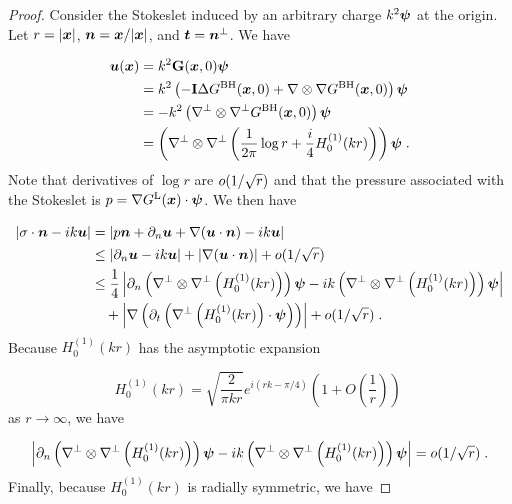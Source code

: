 \begin{proof}
Consider the Stokeslet induced by an arbitrary charge
$k^2 {\boldsymbol \psi}$ at the origin. Let $r = |{\boldsymbol x}|$,
${\boldsymbol n} = {\boldsymbol x}/|{\boldsymbol x}|$, and ${\boldsymbol t} = {\boldsymbol n}^\perp$. We have

\begin{align}
{\boldsymbol u} ({\boldsymbol x}) &= k^2 {\bf G}({\boldsymbol x},0) {\boldsymbol \psi} \\
&= k^2 \left (-{\bf I} \Delta G^{\textrm{BH}}({\boldsymbol x},0)
+ \nabla \otimes \nabla G^{\textrm{BH}}({\boldsymbol x},0)\right ) {\boldsymbol \psi} \\
&= -k^2 \left (\nabla^\perp \otimes \nabla^\perp G^{\textrm{BH}}({\boldsymbol x},0) \right) {\boldsymbol \psi} \\
&= \left(\nabla^\perp \otimes \nabla^\perp \left ( \frac{1}{2\pi}
\log r + \frac{i}{4} H_0^{(1)} (kr) \right ) \right){\boldsymbol \psi} \; .
\end{align}
Note that derivatives of $\log r$ are $o (1/\sqrt{r})$
and that the pressure associated with the Stokeslet is
$p = \nabla G^{\textrm{L}}({\boldsymbol x}) \cdot {\boldsymbol \psi}$. We then have

\begin{align}
\left | \sigma \cdot {\boldsymbol n} - i k {\boldsymbol u} \right | &=
\left | p {\boldsymbol n} + \partial_n {\boldsymbol u} + \nabla ({\boldsymbol u} \cdot {\boldsymbol n})
- ik {\boldsymbol u} \right | \\
&\leq \left | \partial_n {\boldsymbol u} - ik{\boldsymbol u} \right | + \left | \nabla({\boldsymbol u} \cdot {\boldsymbol n}) \right |
+ o (1/\sqrt{r}) \\
&\leq \frac{1}{4} \left | \partial_n \left(\nabla^\perp \otimes
\nabla^\perp \left (H_0^{(1)} (kr) \right ) \right){\boldsymbol \psi}
- i k \left(\nabla^\perp \otimes \nabla^\perp
\left (H_0^{(1)} (kr) \right ) \right){\boldsymbol \psi} \right | \\
& \quad + \left | \nabla \left( \partial_t \left ( 
\nabla^\perp \left (H_0^{(1)} (kr) \right ) \cdot {\boldsymbol \psi}  \right )
\right) \right | + o (1/\sqrt{r}) \; .
\end{align}
Because $H_0^{(1)}(kr)$ has the asymptotic expansion 

\begin{equation}
H_0^{(1)}(kr) = \sqrt{\frac{2}{\pi k r}} e^{i(rk-\pi/4)} \left ( 1 + O\left (
\frac{1}{r} \right ) \right ) \;
\end{equation}
as $r\to \infty$, we have

\begin{equation}
\left | \partial_n \left(\nabla^\perp \otimes
\nabla^\perp \left (H_0^{(1)} (kr) \right ) \right){\boldsymbol \psi}
- ik \left(\nabla^\perp \otimes \nabla^\perp
\left (H_0^{(1)} (kr) \right ) \right){\boldsymbol \psi} \right | =
o ( 1/\sqrt{r} ) \; .
\end{equation}
Finally, because $H_0^{(1)}(kr)$ is radially symmetric,
we have


\end{proof}
